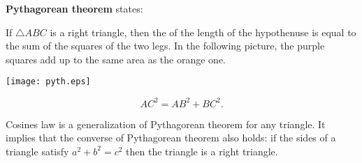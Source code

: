 \documentclass[12pt]{article}
\begin{document}
\textbf{Pythagorean theorem} states:

If $\triangle ABC$ is a right triangle, then the  of the length of the hypothenuse
is equal to the sum of the squares of the two legs. In the following picture, the purple squares add up to the same area as the orange one.
\begin{center}
\texttt{[image: pyth.eps]}
\end{center}
$$AC^2=AB^2+BC^2.$$

Cosines law is a generalization of Pythagorean theorem for any triangle.
It implies that the converse of  Pythagorean theorem  also holds: if
the sides of a triangle satisfy $a^2+b^2=c^2$ then the triangle is a 
right triangle.
\end{document}
